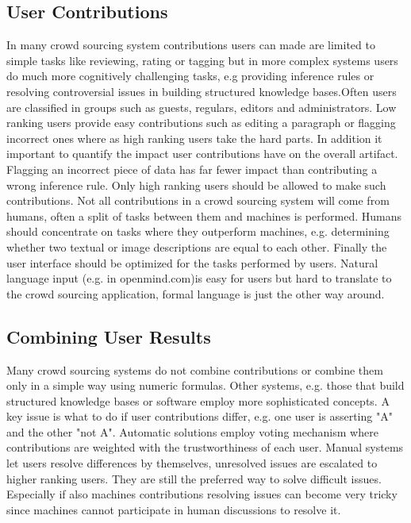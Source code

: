 \documentclass{sig-alternate}
\begin{document}
\subsection{User Contributions}
In many crowd sourcing system contributions users can made are limited to simple tasks like reviewing, rating or tagging but in more complex systems users do much more cognitively challenging tasks, e.g providing inference rules or resolving controversial issues in building structured knowledge bases.Often users are classified in groups such as guests, regulars, editors and administrators. Low ranking users provide easy contributions such as editing a paragraph or flagging incorrect ones where as high ranking users take the hard parts. 
\newline\newline
In addition it important to quantify the impact user contributions have on the overall artifact. Flagging an incorrect piece of data has far fewer impact than contributing a wrong inference rule. Only high ranking users should be allowed to make such contributions. Not all contributions in a crowd sourcing system will come from humans, often a split of tasks between them and machines is performed. Humans should concentrate on tasks where they outperform machines, e.g. determining whether two textual or image descriptions are equal to each other.
\newline\newline
Finally the user interface should be optimized for the tasks performed by users. Natural language input (e.g. in openmind.com)is easy for users but hard to translate to the crowd sourcing application, formal language is just the other way around.
\subsection{Combining User Results}
Many crowd sourcing systems do not combine contributions or combine them only in a simple way using numeric formulas. Other systems, e.g. those that build structured knowledge bases or software employ more sophisticated concepts. A key issue is what to do if user contributions differ, e.g. one user is asserting "A" and the other "not A". Automatic solutions employ voting mechanism where contributions are weighted with the trustworthiness of each user. Manual systems let users resolve differences by themselves, unresolved issues are escalated to higher ranking users. They are still the preferred way to solve difficult issues. Especially if also machines contributions resolving issues can become very tricky since machines cannot participate in human discussions to resolve it.
\end{document}
